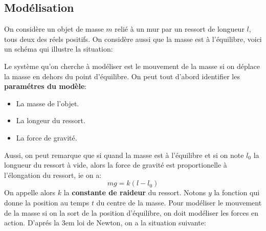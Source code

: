 \documentclass{report}
\begin{document}
      \subsection{Modélisation}
         On considère un objet de masse \(m\) relié à un mur par un ressort de longueur \(l\), tous deux des réels positifs. On considère aussi que la masse est à l'équilibre, voici un schéma qui illustre la situation:
         \begin{center}
         \end{center}
      Le système qu'on cherche à modéliser est le mouvement de la masse si on déplace la masse en dehors du point d'équilibre. On peut tout d'abord identifier les \textbf{paramétres du modèle}:
      \begin{itemize}
         \item La masse de l'objet.
         \item La longeur du ressort.
         \item La force de gravité.
      \end{itemize}
      Aussi, on peut remarque que si quand la masse est à l'équilibre et si on note \(l_0\) la longueur du ressort à vide, alors la force de gravité est proportionelle à l'élongation du ressort, ie on a:
      \[
         mg = k(l - l_0)
      \]
      On appelle alors \(k\) la \textbf{constante de raideur} du ressort. Notons \(y\) la fonction qui donne la position au temps \(t\) du centre de la masse. Pour modéliser le mouvement de la masse si on la sort de la position d'équilibre, on doit modéliser les forces en action.  D'aprés la 3em loi de Newton, on a la situation suivante:
\end{document}
